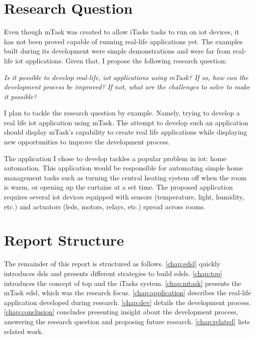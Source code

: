 \section{Research Question}
Even though \gls{mTask} was created to allow \gls{iTasks} tasks to run on \acs{iot} devices, it has not been proved capable of running real-life applications yet. The examples built during its development were simple demonstrations and were far from real-life \acs{iot} applications. Given that, I propose the following research question:

\begin{center}
\emph{Is it possible to develop real-life, \acs{iot} applications using \gls{mTask}? If so, how can the development process be improved? If not, what are the challenges to solve to make it possible?}
\end{center}
I plan to tackle the research question by example. Namely, trying to develop a real life \acs{iot} application using \gls{mTask}. The attempt to develop such an application should display \gls{mTask}'s capability to create real life applications while displaying new opportunities to improve the development process.

The application I chose to develop tackles a popular problem in \acrshort{iot}: home automation. This application would be responsible for automating simple home management tasks such as turning the central heating system off when the room is warm, or opening up the curtains at a set time. The proposed application requires several \acrshort{iot} devices equipped with sensors (temperature, light, humidity, etc.) and actuators (\acsp{led}, motors, relays, etc.) spread across rooms. 


\section{Report Structure}

The remainder of this report is structured as follows.  \cref{chap:edsl} quickly introduces \acp{dsl} and presents different strategies to build \acp{edsl}. \cref{chap:top} introduces the concept of \ac{top} and the \gls{iTasks} system. \cref{chap:mtask} presents the \gls{mTask} \ac{edsl}, which was the research focus. \cref{chap:application} describes the real-life application developed during research. \cref{chap:dev} details the development process. \cref{chap:conclusion} concludes presenting insight about the development process, answering the research question and proposing future research. \cref{chap:related} lists related work.

